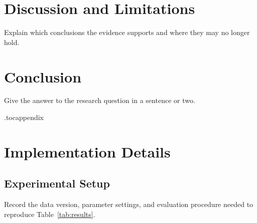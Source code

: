 \documentclass[11pt,letterpaper]{article}
\begin{document}

\section{Discussion and Limitations}
Explain which conclusions the evidence supports and where they may no longer hold.

\section{Conclusion}
Give the answer to the research question in a sentence or two.





\clearpage
\appendix
\etocdepthtag.toc{appendix}

\begingroup
\setlength{\parskip}{0pt}
\etocstandardlines
{}
\hypersetup{linktoc=page}
\tableofcontents
\endgroup

\section{Implementation Details}
\label{app:details}
\subsection{Experimental Setup}
Record the data version, parameter settings, and evaluation procedure needed
to reproduce Table~\ref{tab:results}.
\end{document}
